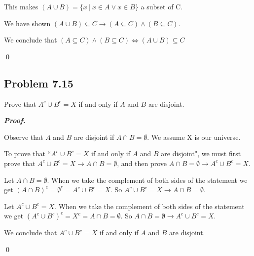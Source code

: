 \documentclass{article}
\begin{document}
This makes $(A \cup B)=\{x\ |\ x \in A \lor x \in B \}$ a subset of C.

We have shown $(A \cup B) \subseteq C \rightarrow (A \subseteq C) \land (B \subseteq C)$.

We conclude that $(A \subseteq C) \land (B \subseteq C) \iff (A \cup B) \subseteq C$

\qed


\pagebreak
\subsection{Problem 7.15}
Prove that $A^c \cup B^c = X$ if and only if $A$ and $B$ are disjoint.

\textbf{\textit{Proof.}}

Observe that $A$ and $B$ are disjoint if $A \cap B = \emptyset$. We assume X is our universe.

To prove that  ``$A^c \cup B^c = X$ if and only if $A$ and $B$ are disjoint", we must first prove that $A^c \cup B^c = X \rightarrow A \cap B = \emptyset$, and then prove $A \cap B = \emptyset \rightarrow A^c \cup B^c = X$.

Let $A \cap B = \emptyset$. When we take the complement of both sides of the statement we get
$(A \cap B)^c = \emptyset^c = A^c \cup B^c = X$. So $A^c \cup B^c = X \rightarrow A \cap B = \emptyset$.

Let $A^c \cup B^c = X$. When we take the complement of both sides of the statement we get
$(A^c \cup B^c)^c = X^c = A \cap B = \emptyset$. So $A \cap B = \emptyset \rightarrow A^c \cup B^c = X$.

We conclude that $A^c \cup B^c = X$ if and only if $A$ and $B$ are disjoint.


\qed
\end{document}
